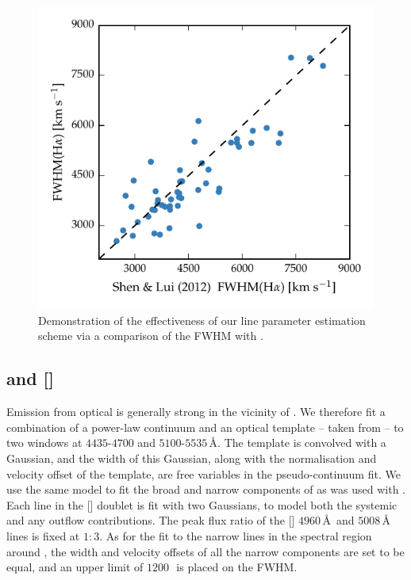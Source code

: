\begin{figure}
    \centering 
    \includegraphics[width=0.8\linewidth]{figures/chapter03/shen_comparison_ha.pdf} 
    \caption[{Demonstration of the effectiveness of our \ha line parameter estimation scheme.}]{Demonstration of the effectiveness of our line parameter estimation scheme via a comparison of the \ha FWHM with \citet{shen12}.} 
    \label{fig:shen_comparison_ha}
\end{figure}

\subsection{\hb and []}
\label{sec:hb}

Emission from optical  is generally strong in the vicinity of \hbns.
We therefore fit a combination of a power-law continuum and an optical  template -- taken from \citet{boroson92} -- to two windows at $4435$-$4700$ and $5100$-$5535$\,\AA. 
The  template is convolved with a Gaussian, and the width of this Gaussian, along with the normalisation and velocity offset of the  template, are free variables in the pseudo-continuum fit.
We use the same model to fit the broad and narrow components of \hb as was used with \hans. 
Each line in the [] doublet is fit with two Gaussians, to model both the systemic and any outflow contributions. 
The peak flux ratio of the [] $4960$\,\AA\, and $5008$\,\AA\, lines is fixed at $1:3$. 
As for the fit to the narrow lines in the spectral region around \hans, the width and velocity offsets of all the narrow components are set to be equal, and an upper limit of $1200$\,\kms\, is placed on the FWHM. 

